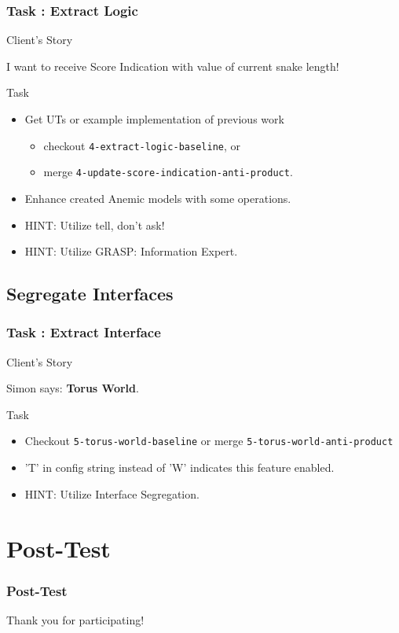 \documentclass[english]{beamer}
\newenvironment{narrowblock}[1]{%
\begin{center}
\begin{minipage}{10.5cm}
\begin{block}{#1}
}{%
\end{block}
\end{minipage}
\end{center}
}
\begin{document}
\begin{frame}
\frametitle{Task \thesubsection: Extract Logic}

\begin{narrowblock}{Client's Story}
I want to receive Score Indication with value of current snake length!
\end{narrowblock}

\pause
\begin{narrowblock}{Task}
\begin{itemize}[<+->]
 \item Get UTs or example implementation of previous work
 \begin{itemize}[<+->]
  \item checkout \texttt{4-extract-logic-baseline}, or
  \item merge \texttt{4-update-score-indication-anti-product}.
 \end{itemize}
\item Enhance created Anemic models with some operations.
\item HINT: Utilize tell, don't ask!
\item HINT: Utilize GRASP: Information Expert.
\end{itemize}
\end{narrowblock}
\end{frame}

\subsection{Segregate Interfaces}

\begin{frame}
\frametitle{Task \thesubsection: Extract Interface}

\begin{narrowblock}{Client's Story}
Simon says: \textbf{Torus World}.
\end{narrowblock}

\pause
\begin{narrowblock}{Task}
\begin{itemize}[<+->]
\item Checkout \texttt{5-torus-world-baseline} or merge \texttt{5-torus-world-anti-product}
\item 'T' in config string instead of 'W' indicates this feature enabled.
\item HINT: Utilize Interface Segregation.
\end{itemize}
\end{narrowblock}
\end{frame}

\section{Post-Test}
\begin{frame}
\frametitle{Post-Test}
\end{frame}

\begin{frame}
\begin{center}
Thank you for participating!
\end{center}
\end{frame}
\end{document}
